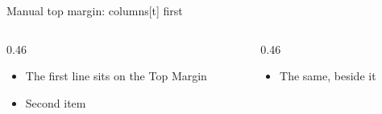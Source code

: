 \SMManualTopMargin
\begin{standardframe}{Manual top margin: columns[t] first}
	\begin{columns}[t,onlytextwidth]
		\begin{column}{0.46\linewidth}
			\begin{itemize}
				\item The first line sits on the Top Margin
				\item Second item
			\end{itemize}
		\end{column}
		\begin{column}{0.46\linewidth}
			\begin{itemize}
				\item The same, beside it
			\end{itemize}
		\end{column}
	\end{columns}
\end{standardframe}
